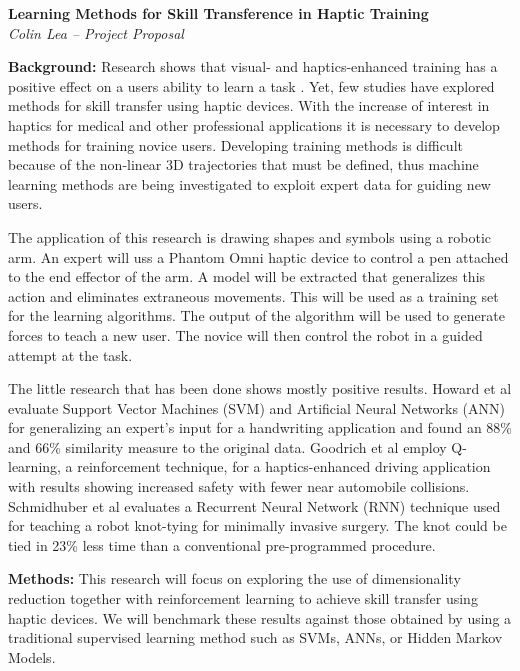 \documentclass[11pt, final]{article}
\begin{document}
         

\begin{center}
{\bf  \Large Learning Methods for Skill Transference in Haptic Training}\\
{\it Colin Lea -- Project Proposal}
\end{center}

{\bf \large Background:}
Research shows that visual- and haptics-enhanced training has a positive effect on a users ability to learn a task \cite {Feygin2002, Liu2006, HowardLearning}. Yet, few studies have explored methods for skill transfer using haptic devices. With the increase of interest in haptics for medical and other professional applications it is necessary to develop methods for training novice users. Developing training methods is difficult because of the non-linear 3D trajectories that must be defined, thus machine learning methods are being investigated to exploit expert data for guiding new users.

The application of this research is drawing shapes and symbols using a robotic arm. An expert will uss a Phantom Omni haptic device to control a pen attached to the end effector of the arm. A model will be extracted that generalizes this action and eliminates extraneous movements. This will be used as a training set for the learning algorithms. The output of the algorithm will be used to generate forces to teach a new user. The novice will then control the robot in a guided attempt at the task. 



The little research that has been done shows mostly positive results. Howard et al \cite {HowardLearning} evaluate Support Vector Machines (SVM) and Artificial Neural Networks (ANN) for generalizing an expert's input for a handwriting application and found an 88\% and 66\% similarity measure to the original data.  Goodrich et al \cite {GoodrichDriving} employ Q-learning, a reinforcement technique, for a haptics-enhanced driving application with results showing increased safety with fewer near automobile collisions. Schmidhuber et al \cite{MayerKnots} evaluates a Recurrent Neural Network (RNN) technique used for teaching a robot knot-tying for minimally invasive surgery. The knot could be tied in 23\% less time than a conventional pre-programmed procedure.

{\bf \large Methods:}
This research will focus on exploring the use of dimensionality reduction together with reinforcement learning to achieve skill transfer using haptic devices. We will benchmark these results against those obtained by using a traditional supervised learning method such as SVMs, ANNs, or Hidden Markov Models.
\end{document}
